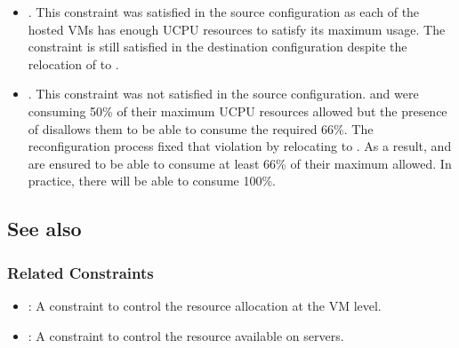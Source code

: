 \begin{itemize}
\item {}. This constraint was satisfied in the source configuration
as each of the hosted VMs has enough UCPU resources to satisfy its maximum usage. The constraint is still
satisfied in the destination configuration despite the relocation of  to .

\item {}. This constraint was not satisfied in the source configuration.
 and  were consuming 50\% of their maximum UCPU resources allowed but the presence
of  disallows them to be able to consume the required 66\%. The reconfiguration process
fixed that violation by relocating  to . As a result,  and  are ensured to be
able to consume at least 66\% of their maximum allowed. In practice, there will be able to consume 100\%.

\end{itemize}



\subsection{See also}

\subsubsection{Related Constraints}
\begin{itemize}
\item {}: A constraint to control the resource allocation
at the VM level.
\item {}: A constraint to control the resource available on servers.
\end{itemize}

